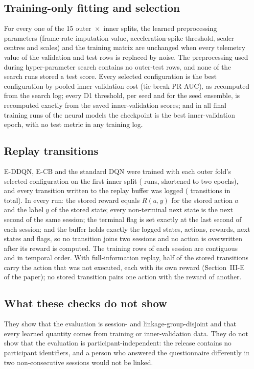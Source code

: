 \subsection{Training-only fitting and selection}
For every one of the 15 outer~$\times$~inner splits, the learned preprocessing parameters (frame-rate imputation value, acceleration-spike threshold, scaler centres and scales) and the training matrix are unchanged when every telemetry value of the validation and test rows is replaced by noise. The preprocessing used during hyper-parameter search contains no outer-test rows, and none of the \PVHPORuns{} search runs stored a test score. Every selected configuration is the best configuration by pooled inner-validation cost (tie-break PR-AUC), as recomputed from the search log; every D1 threshold, per seed and for the seed ensemble, is recomputed exactly from the saved inner-validation scores; and in all \PVCheckpointRuns{} final training runs of the neural models the checkpoint is the best inner-validation epoch, with no test metric in any training log.

\subsection{Replay transitions}
E-DDQN, E-CB and the standard DQN were trained with each outer fold's selected configuration on the first inner split (\PVReplayRuns{} runs, shortened to two epochs), and every transition written to the replay buffer was logged (\PVTransitions{} transitions in total). In every run: the stored reward equals $R(a,y)$ for the stored action $a$ and the label $y$ of the stored state; every non-terminal next state is the next second of the same session; the terminal flag is set exactly at the last second of each session; and the buffer holds exactly the logged states, actions, rewards, next states and flags, so no transition joins two sessions and no action is overwritten after its reward is computed. The training rows of each session are contiguous and in temporal order. With full-information replay, half of the stored transitions carry the action that was not executed, each with its own reward (Section~III-E of the paper); no stored transition pairs one action with the reward of another.

\subsection{What these checks do not show}
They show that the evaluation is session- and linkage-group-disjoint and that every learned quantity comes from training or inner-validation data. They do not show that the evaluation is participant-independent: the release contains no participant identifiers, and a person who answered the questionnaire differently in two non-consecutive sessions would not be linked.
